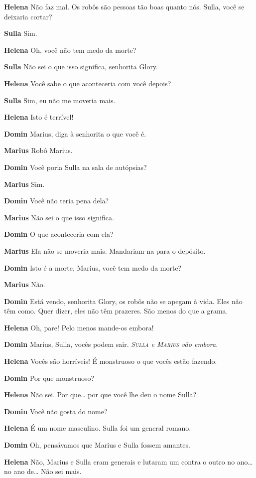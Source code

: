 \textbf{Helena} Não faz mal. Os robôs são pessoas tão boas quanto nós. Sulla, você se
deixaria cortar?

\textbf{Sulla} Sim.

\textbf{Helena} Oh, você não tem medo da morte?

\textbf{Sulla} Não sei o que isso significa, senhorita Glory.

\textbf{Helena} Você sabe o que aconteceria com você depois?

\textbf{Sulla} Sim, eu não me moveria mais.

\textbf{Helena} Isto é terrível!

\textbf{Domin} Marius, diga à senhorita o que você é.

\textbf{Marius} Robô Marius.

\textbf{Domin} Você poria Sulla na sala de autópsias?

\textbf{Marius} Sim.

\textbf{Domin} Você não teria pena dela?

\textbf{Marius} Não sei o que isso significa.

\textbf{Domin} O que aconteceria com ela?

\textbf{Marius} Ela não se moveria mais. Mandariam-na para o depósito.

\textbf{Domin} Isto é a morte, Marius, você tem medo da morte?

\textbf{Marius} Não.

\textbf{Domin} Está vendo, senhorita Glory, os robôs não se apegam à vida. Eles não têm
como. Quer dizer, eles não têm prazeres. São menos do que a grama.

\textbf{Helena} Oh, pare! Pelo menos mande-os embora!

\textbf{Domin} Marius, Sulla, vocês podem sair.
\emph{\textsc{Sulla} e \textsc{Marius} vão embora.}

\textbf{Helena} Vocês são horríveis! É monstruoso o que vocês estão fazendo.

\textbf{Domin} Por que monstruoso?

\textbf{Helena} Não sei. Por que\ldots{} por que você lhe deu o nome Sulla?

\textbf{Domin} Você não gosta do nome?

\textbf{Helena} É um nome masculino. Sulla foi um general romano.

\textbf{Domin} Oh, pensávamos que Marius e Sulla fossem \mbox{amantes}.

\textbf{Helena} Não, Marius e Sulla eram generais e lutaram um contra o outro no ano\ldots{}
no ano de\ldots{} Não sei mais.

